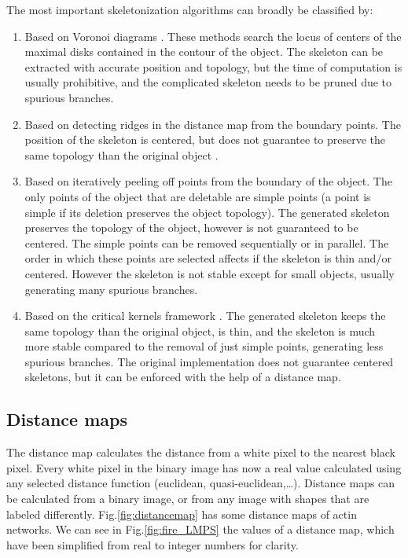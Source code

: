 The most important skeletonization algorithms can broadly be classified by:

\begin{enumerate}
  \item \label{itm:voronoi} Based on Voronoi diagrams \citep{ogniewicz_hierarchic_1995}.
    These methods search the locus of centers of the maximal disks
    contained in the contour of the object. The skeleton can be
    extracted with accurate position and topology, but the time
    of computation is usually prohibitive, and the complicated skeleton needs to be
    pruned due to spurious branches.
  \item \label{itm:ridges} Based on detecting ridges
    in the distance map from the boundary points. The
    position of the skeleton is centered, but does not guarantee to preserve
    the same topology than the original object
    \citep{ge_generation_1996}.
  \item \label{itm:simple} Based on iteratively peeling off points from the boundary of the object. The only points of the object that are deletable are simple points (a point is simple if its deletion preserves
    the object topology). The generated skeleton preserves the topology of the object, however is not guaranteed to be centered. The simple points can be removed sequentially or in parallel.
    The order in which these points are selected affects if the skeleton is thin and/or centered. However the skeleton is not stable except for small objects, usually generating many spurious branches.
  \item \label{itm:critical} Based on the critical kernels framework \cite{couprie_asymmetric_2016}. The generated skeleton keeps the same topology than the original object, is thin, and the skeleton is much more stable compared to the removal of just simple points, generating less spurious branches. The original implementation \cite{couprie_asymmetric_2016} does not guarantee centered skeletons, but it can be enforced with the help of a distance map.
\end{enumerate}

\subsection{Distance maps}%
\label{sub:distance_maps}

The distance map calculates the distance from a
white pixel to the nearest black pixel. Every white pixel in the binary image
has now a real value calculated using any selected distance function (euclidean,
quasi-euclidean,\ldots ). Distance maps can be calculated from a binary image, or from
any image with shapes that are labeled differently.
Fig.\ref{fig:distancemap} has some distance maps of actin networks.
We can see in Fig.\ref{fig:fire_LMPS} the values of a distance map, which have
been simplified from real to integer numbers for clarity.

